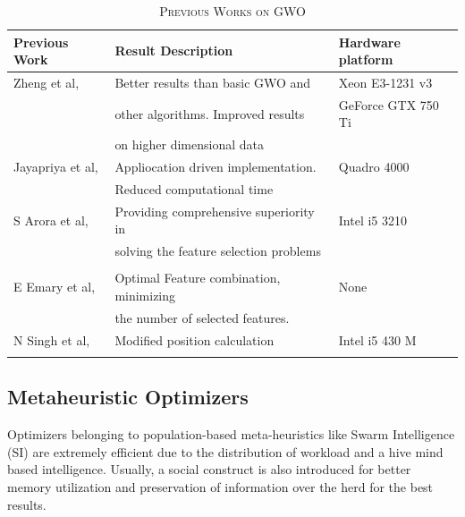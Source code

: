 \documentclass[conference]{IEEEtran}
\theoremstyle{definition}
\begin{document}
\begin{table}[!t]
\caption{\textsc{Previous Works on GWO}}
\label{table:pgwo}
\centering
\scalebox{0.8}
{
\begin{tabular}{| l | l | l |}
\hline
{Previous Work} & {Result Description} & {Hardware platform}\\
\hline
{Zheng et al,\cite{wang}} & {Better results than basic GWO and} & {Xeon E3-1231 v3}\\
{}&{other algorithms. Improved results}&{GeForce GTX 750 Ti}\\
{}&{on higher dimensional data}&{}\\
\hline
{Jayapriya et al,\cite{jp}} & {Appliocation driven implementation.} & {Quadro 4000}\\
{}&{Reduced computational time}&{}\\
\hline
{S Arora et al,\cite{arora}} & {Providing comprehensive superiority in} & {Intel i5 3210}\\
{}&{solving the feature selection problems}&{}\\
{}&{}&{}\\
\hline
{E Emary et al,\cite{emary}} & {Optimal Feature combination, minimizing} & {None}\\
{}&{the number of selected features.}&{}\\
\hline
{N Singh et al,\cite{singh}} & {Modified position calculation} & {Intel i5 430 M}\\
{}&{}&{}\\
\hline
\end{tabular}
}
\end{table}





\subsection{Metaheuristic Optimizers}
Optimizers belonging to population-based meta-heuristics like Swarm Intelligence (SI) are extremely efficient due to the distribution of workload and a hive mind based intelligence. Usually, a social construct is also introduced for better memory utilization and preservation of information over the herd for the best results. 

% 
\end{document}
